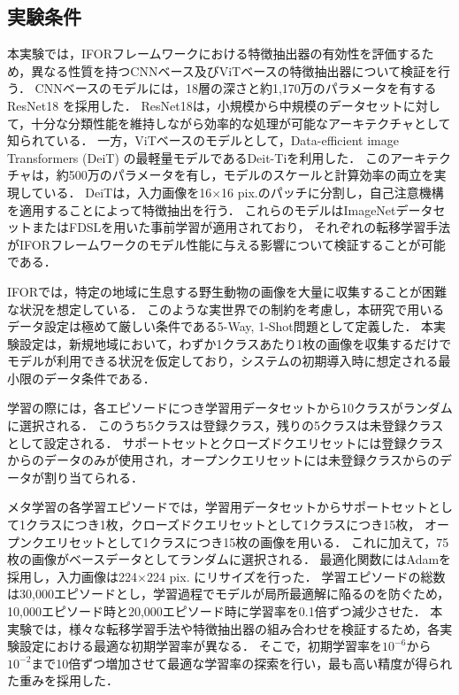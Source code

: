 \subsection{実験条件}

本実験では，IFORフレームワークにおける特徴抽出器の有効性を評価するため，異なる性質を持つCNNベース及びViTベースの特徴抽出器について検証を行う．
CNNベースのモデルには，18層の深さと約1,170万のパラメータを有するResNet18 \cite{resnet}を採用した．
ResNet18は，小規模から中規模のデータセットに対して，十分な分類性能を維持しながら効率的な処理が可能なアーキテクチャとして知られている．
一方，ViTベースのモデルとして，Data-efficient image Transformers (DeiT) \cite{deit} の最軽量モデルであるDeit-Tiを利用した．
このアーキテクチャは，約500万のパラメータを有し，モデルのスケールと計算効率の両立を実現している．
DeiTは，入力画像を16$\times$16 pix.のパッチに分割し，自己注意機構を適用することによって特徴抽出を行う．
これらのモデルはImageNetデータセットまたはFDSLを用いた事前学習が適用されており，
それぞれの転移学習手法がIFORフレームワークのモデル性能に与える影響について検証することが可能である．

IFORでは，特定の地域に生息する野生動物の画像を大量に収集することが困難な状況を想定している．
このような実世界での制約を考慮し，本研究で用いるデータ設定は極めて厳しい条件である5-Way, 1-Shot問題として定義した．
本実験設定は，新規地域において，わずか1クラスあたり1枚の画像を収集するだけでモデルが利用できる状況を仮定しており，システムの初期導入時に想定される最小限のデータ条件である．

学習の際には，各エピソードにつき学習用データセットから10クラスがランダムに選択される．
このうち5クラスは登録クラス，残りの5クラスは未登録クラスとして設定される．
サポートセットとクローズドクエリセットには登録クラスからのデータのみが使用され，オープンクエリセットには未登録クラスからのデータが割り当てられる．

メタ学習の各学習エピソードでは，学習用データセットからサポートセットとして1クラスにつき1枚，クローズドクエリセットとして1クラスにつき15枚，
オープンクエリセットとして1クラスにつき15枚の画像を用いる．
これに加えて，75枚の画像がベースデータとしてランダムに選択される．
最適化関数にはAdamを採用し，入力画像は224$\times$224 pix. にリサイズを行った．
学習エピソードの総数は30,000エピソードとし，学習過程でモデルが局所最適解に陥るのを防ぐため，10,000エピソード時と20,000エピソード時に学習率を0.1倍ずつ減少させた．
本実験では，様々な転移学習手法や特徴抽出器の組み合わせを検証するため，各実験設定における最適な初期学習率が異なる．
そこで，初期学習率を$10^{-6}$から$10^{-2}$まで10倍ずつ増加させて最適な学習率の探索を行い，最も高い精度が得られた重みを採用した．

